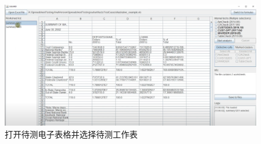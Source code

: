 \begin{figure}[tp]   
    \centering
    \includegraphics[width=\textwidth]{figure/sg/sguard-3.png}
    \caption{打开待测电子表格并选择待测工作表}
    \label{figure-sg3}
\end{figure}